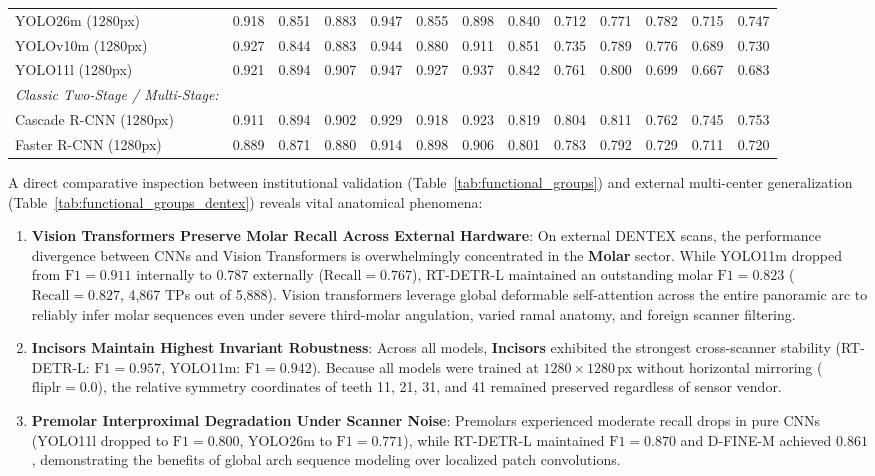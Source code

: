 \documentclass[10pt,journal,compsoc]{IEEEtran}
\begin{document}
\begin{table}[t]
{\begin{tabular}{l c c c c c c c c c c c c}
YOLO26m (1280px) & 0.918 & 0.851 & 0.883 & 0.947 & 0.855 & 0.898 & 0.840 & 0.712 & 0.771 & 0.782 & 0.715 & 0.747 \\
YOLOv10m (1280px) & 0.927 & 0.844 & 0.883 & 0.944 & 0.880 & 0.911 & 0.851 & 0.735 & 0.789 & 0.776 & 0.689 & 0.730 \\
YOLO11l (1280px) & 0.921 & 0.894 & 0.907 & 0.947 & 0.927 & 0.937 & 0.842 & 0.761 & 0.800 & 0.699 & 0.667 & 0.683 \\
\midrule
\textit{Classic Two-Stage / Multi-Stage:} & & & & & & & & & & & & \\
Cascade R-CNN (1280px) & 0.911 & 0.894 & 0.902 & 0.929 & 0.918 & 0.923 & 0.819 & 0.804 & 0.811 & 0.762 & 0.745 & 0.753 \\
Faster R-CNN (1280px) & 0.889 & 0.871 & 0.880 & 0.914 & 0.898 & 0.906 & 0.801 & 0.783 & 0.792 & 0.729 & 0.711 & 0.720 \\
\bottomrule
\end{tabular}}
\end{table}

A direct comparative inspection between institutional validation (Table~\ref{tab:functional_groups}) and external multi-center generalization (Table~\ref{tab:functional_groups_dentex}) reveals vital anatomical phenomena:
\begin{enumerate}
    \item \textbf{Vision Transformers Preserve Molar Recall Across External Hardware}: On external DENTEX scans, the performance divergence between CNNs and Vision Transformers is overwhelmingly concentrated in the \textbf{Molar} sector. While YOLO11m dropped from $\text{F1} = 0.911$ internally to $0.787$ externally ($\text{Recall} = 0.767$), RT-DETR-L maintained an outstanding molar $\text{F1} = 0.823$ ($\text{Recall} = 0.827$, 4,867 TPs out of 5,888). Vision transformers leverage global deformable self-attention across the entire panoramic arc to reliably infer molar sequences even under severe third-molar angulation, varied ramal anatomy, and foreign scanner filtering.
    \item \textbf{Incisors Maintain Highest Invariant Robustness}: Across all models, \textbf{Incisors} exhibited the strongest cross-scanner stability (RT-DETR-L: $\text{F1} = 0.957$, YOLO11m: $\text{F1} = 0.942$). Because all models were trained at $1280 \times 1280$\,px without horizontal mirroring ($\text{fliplr} = 0.0$), the relative symmetry coordinates of teeth 11, 21, 31, and 41 remained preserved regardless of sensor vendor.
    \item \textbf{Premolar Interproximal Degradation Under Scanner Noise}: Premolars experienced moderate recall drops in pure CNNs (YOLO11l dropped to $\text{F1} = 0.800$, YOLO26m to $\text{F1} = 0.771$), while RT-DETR-L maintained $\text{F1} = 0.870$ and D-FINE-M achieved $0.861$, demonstrating the benefits of global arch sequence modeling over localized patch convolutions.
\end{enumerate}
\end{document}
